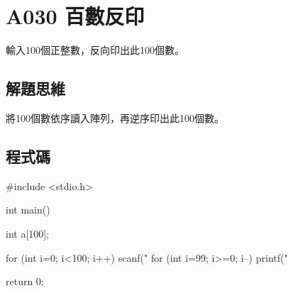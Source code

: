 \section{A030 百數反印}
輸入100個正整數，反向印出此100個數。

\subsection{解題思維}
將100個數依序讀入陣列，再逆序印出此100個數。

\subsection{程式碼}
\begin{cppcode}
	#include <stdio.h>
	
	int main()
	{
		int a[100];
		
		for (int i=0; i<100; i++) scanf("%
		for (int i=99; i>=0; i--) printf(" %
		
		return 0;
	}
\end{cppcode}
